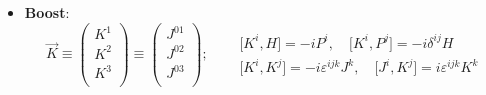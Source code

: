 \documentclass[../main.tex]{subfiles}
\begin{document}
\begin{nota}
\begin{itemize}
        \item \textbf{Boost}:
        \[
        \boxed{
        \Vec{K} \equiv 
        \begin{pmatrix}
            K^1\\
            K^2\\
            K^3\\
        \end{pmatrix}\equiv 
        \begin{pmatrix}
            J^{01}\\
            J^{02}\\
            J^{03}\\
        \end{pmatrix}; \quad
        \begin{aligned} 
            &\big[ K^i, H \big] = -iP^i, \quad \big[ K^i, P^j \big] = -i\delta^{ij}H\\
            &\big[ K^{i}, K^{j} \big] = -i\varepsilon^{ijk}J^k, \quad \big[ J^{i}, K^{j} \big] = i\varepsilon^{ijk}K^k
        \end{aligned}}
        \]
    \end{itemize}
    \label{note:3D_poincare_algebra}
\end{nota}
\end{document}

